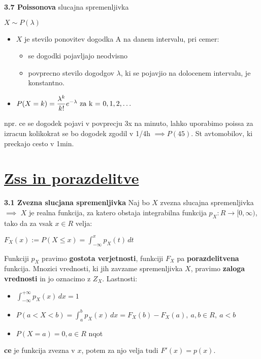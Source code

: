 \documentclass{article}
\begin{document}
\begin{multicols}{3}
\textbf{3.7 Poissonova} slucajna spremenljivka
\begin{center}
    \begin{math}
        X \sim P(\lambda)
    \end{math}
\end{center}
\begin{itemize}
    \item $X$ je stevilo ponovitev dogodka A na danem intervalu, pri cemer:
        \begin{itemize}
            \item se dogodki pojavljajo neodvisno
            \item povprecno stevilo dogodgov $\lambda$, ki se pojavjio na dolocenem intervalu, je konstantno.
        \end{itemize}
    \item \begin{math}
        P(X = k) =  \dfrac{ \lambda^{k} }{k!} e^{- \lambda}$ za k = $ 0,1,2,\dots
    \end{math}
\end{itemize}
npr. ce se dogodek pojavi v povprecju 3x na minuto, lahko uporabimo poissa za izracun
kolikokrat se bo dogodek zgodil v  1/4h $\implies P(45)$. St avtomobilov, ki preckajo cesto v 1min.

\section{\underline{Zss in porazdelitve}}

\textbf{3.1 Zvezna slucjana spremenljivka}
Naj bo $X$ zvezna slucajna spremenljivka $\implies$ $X$ je realna funkcija,
za katero obstaja integrabilna funkcija $p_{X}: R \rightarrow [0, \infty)$,
tako da za vsak $x \in R$ velja:

\begin{center}
    \begin{math}
        F_{X}(x) := P(X \leq x) = \int_{- \infty}^{x} p_{X}(t) \,dt
    \end{math}
\end{center}

Funkciji $p_{X}$ pravimo \textbf{gostota verjetnosti}, funkciji $F_{X}$ pa
\textbf{porazdelitvena} funkcija. Mnozici vrednosti, ki jih zavzame spremenljivka
$X$, pravimo \textbf{zaloga vrednosti} in jo oznacimo z $Z_{X}$.
Lastnosti:
\begin{itemize}
    \item \begin{math}
        \int_{- \infty}^{+ \infty} p_{X}(x) \,dx = 1
    \end{math}
    \item \begin{math}
        P(a < X < b) = \int_{a}^{b} p_{X}(x) \,dx = F_{X}(b) - F_{X}(a),\: a,b \in R,\: a < b
    \end{math}
    \item \begin{math}
        P(X = a) = 0, a \in R
    \end{math} nqot
\end{itemize}
\textbf{ce} je funkcija zvezna v $x$, potem za njo velja tudi $F'(x) = p(x)$.


\end{multicols}
\end{document}
